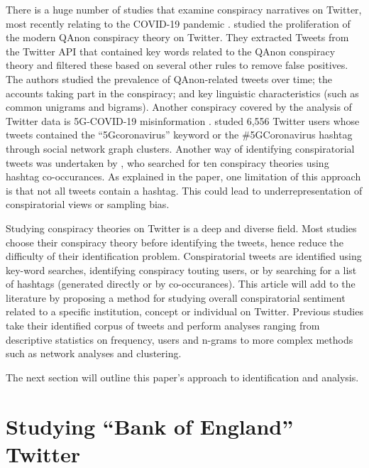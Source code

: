 \documentclass[11pt]{article}
\begin{document}
There is a huge number of studies that examine conspiracy narratives on Twitter, most recently relating to the COVID-19 pandemic \citep[to name a few]{eberl2021populism, jamison2020not, stephens2020geospatial}. \cite{jackson2021qanon} studied the proliferation of the modern QAnon conspiracy theory on Twitter. They extracted Tweets from the Twitter API that contained key words related to the QAnon conspiracy theory and filtered these based on several other rules to remove false positives. The authors studied the prevalence of QAnon-related tweets over time; the accounts taking part in the conspiracy; and key linguistic characteristics (such as common unigrams and bigrams). Another conspiracy covered by the analysis of Twitter data is 5G-COVID-19 misinformation \citep{ahmed2020covid, schroeder2021wico}. \cite{ahmed2020covid} studed 6,556 Twitter users whose tweets contained the ``5Gcoronavirus'' keyword or the \#5GCoronavirus hashtag through social network graph clusters. Another way of identifying conspiratorial tweets was undertaken by \cite{mahl2021nasa}, who searched for ten conspiracy theories using hashtag co-occurances. As explained in the paper, one limitation of this approach is that not all tweets contain a hashtag. This could lead to underrepresentation of conspiratorial views or sampling bias.

Studying conspiracy theories on Twitter is a deep and diverse field. Most studies choose their conspiracy theory before identifying the tweets, hence reduce the difficulty of their identification problem. Conspiratorial tweets are identified using key-word searches, identifying conspiracy touting users, or by searching for a list of hashtags (generated directly or by co-occurances). This article will add to the literature by proposing a method for studying overall conspiratorial sentiment related to a specific institution, concept or individual on Twitter. Previous studies take their identified corpus of tweets and perform analyses ranging from descriptive statistics on frequency, users and n-grams to more complex methods such as network analyses and clustering.

The next section will outline this paper's approach to identification and analysis.

\section{Studying ``Bank of England'' Twitter} \label{Section: Studying ``Bank of England'' Twitter}
\end{document}
